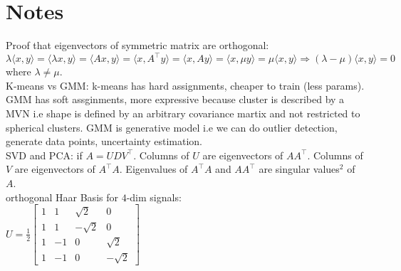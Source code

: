 \section{Notes}
\textbullet Proof that eigenvectors of symmetric matrix are orthogonal: $\lambda \langle x,y \rangle = \langle \lambda x,y \rangle = \langle Ax,y \rangle = \langle x,A^\top y \rangle = \langle x,A y \rangle = \langle x,\mu y \rangle = \mu \langle x,y \rangle \Rightarrow (\lambda-\mu)\langle x,y\rangle=0$ where $\lambda \neq \mu$.\\
\textbullet K-means vs GMM: k-means has hard assignments, cheaper to train (less params). GMM has soft assginments, more expressive because cluster is described by a MVN i.e shape is defined by an arbitrary covariance martix and not restricted to spherical clusters. GMM is generative model i.e we can do outlier detection, generate data points, uncertainty estimation. \\
\textbullet SVD and PCA: if $A=UDV^\top$. Columns of $U$ are eigenvectors of $AA^\top$. Columns of $V$ are eigenvectors of $A^\top A$. Eigenvalues of $A^\top A$ and $AA^\top$ are singular values$^2$ of $A$. \\
\textbullet orthogonal Haar Basis for $4$-dim signals: \\
$U = \frac{1}{2}
\begin{bmatrix}
    1 & 1 & \sqrt{2} & 0 \\
    1 & 1 & -\sqrt{2} & 0 \\
    1 & -1 & 0 & \sqrt{2} \\
    1 & -1 & 0 & -\sqrt{2}
\end{bmatrix}
$